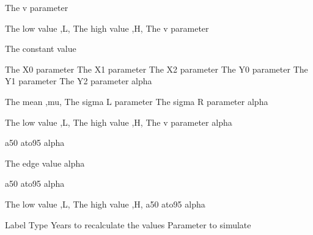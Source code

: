  {The v parameter}
\par\textbf{}\par
{} {The low value ,L,}
 {The high value ,H,}
 {The v parameter}
\par\textbf{}\par
{} {The constant value}
\par\textbf{}\par
{} {The X0 parameter}
 {The X1 parameter}
 {The X2 parameter}
 {The Y0 parameter}
 {The Y1 parameter}
 {The Y2 parameter}
 {alpha}
\par\textbf{}\par
{} {The mean ,mu,}
 {The sigma L parameter}
 {The sigma R parameter}
 {alpha}
\par\textbf{}\par
{} {The low value ,L,}
 {The high value ,H,}
 {The v parameter}
 {alpha}
\par\textbf{}\par
{} {a50}
 {ato95}
 {alpha}
\par\textbf{}\par
{} {The edge value}
 {alpha}
\par\textbf{}\par
{} {a50}
 {ato95}
 {alpha}
\par\textbf{}\par
{} {The low value ,L,}
 {The high value ,H,}
 {a50}
 {ato95}
 {alpha}
\par\par
{} {Label}
 {Type}
 {Years to recalculate the values}
 {Parameter to simulate}
\par\textbf{}\par
